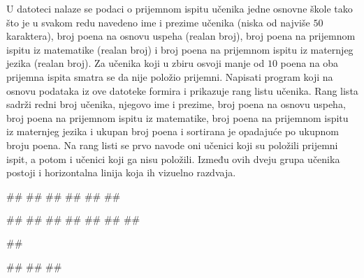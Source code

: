 \begin{Exercise}[label=4_17]
U datoteci  nalaze se podaci o prijemnom ispitu učenika jedne osnovne škole tako što je u svakom redu navedeno ime i prezime učenika (niska od najviše $50$ karaktera), broj poena na osnovu uspeha (realan broj), broj poena na prijemnom ispitu iz matematike (realan broj) i broj poena na prijemnom ispitu iz maternjeg jezika (realan broj). Za učenika koji u zbiru osvoji manje od $10$ poena na oba prijemna ispita smatra se da nije položio prijemni. Napisati program koji na osnovu podataka iz ove datoteke formira i prikazuje rang listu učenika. Rang lista sadrži redni broj učenika, njegovo ime i prezime, broj poena na osnovu uspeha, broj poena na prijemnom ispitu iz matematike, broj poena na prijemnom ispitu iz maternjeg jezika i ukupan broj poena i sortirana je opadajuće po ukupnom broju poena. Na rang listi se prvo navode oni učenici koji su položili prijemni ispit, a potom i učenici koji ga nisu položili. Između ovih dveju grupa učenika postoji i horizontalna linija koja ih vizuelno razdvaja.

\begin{miditest}
\begin{test}{1}
##
##
##       
##         
##
##
  
#\naslovIzlaz#
##
##
##
##
#\izlaz{-----------------------------------}#
##
\end{test}
\end{miditest}
\begin{miditest}
\begin{test}{2}
##  

#\naslovIzlazZaGresku#
##
##
\end{test}
\end{miditest}
\end{Exercise}

\begin{Answer}[ref=4_17]
\end{Answer}

